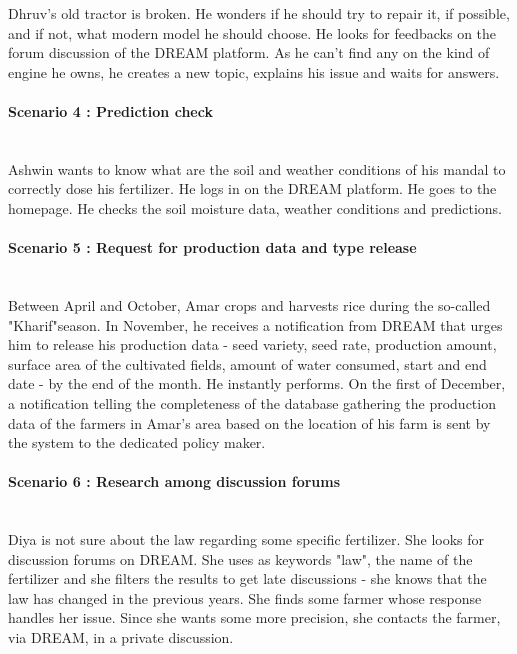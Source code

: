 Dhruv's old tractor is broken. He wonders if he should try to repair it, if possible, and if not, what modern model he should choose. He looks for feedbacks on the forum discussion of the DREAM platform. As he can't find any on the kind of engine he owns, he creates a new topic, explains his issue and waits for answers.

\paragraph{Scenario 4 : Prediction check}\mbox{} \\

Ashwin wants to know what are the soil and weather conditions of his mandal to correctly dose his fertilizer. He logs in on the DREAM platform. He goes to the homepage. He checks the soil moisture data, weather conditions and predictions.

\paragraph{Scenario 5 : Request for production data and type release}\mbox{} \\

Between April and October, Amar crops and harvests rice during the so-called "Kharif"season. In November, he receives a notification from DREAM that urges him to release his production data - seed variety, seed rate, production amount, surface area of the cultivated fields, amount of water consumed, start and end date - by the end of the month. He instantly performs. On the first of December, a notification telling the completeness of the database gathering the production data of the farmers in Amar's area based on the location of his farm is sent by the system to the dedicated policy maker.

\paragraph{Scenario 6 : Research among discussion forums}\mbox{} \\

Diya is not sure about the law regarding some specific fertilizer. She looks for discussion forums on DREAM. She uses as keywords "law", the name of the fertilizer and she filters the results to get late discussions - she knows that the law has changed in the previous years. She finds some farmer whose response handles her issue. Since she wants some more precision, she contacts the farmer, via DREAM, in a private discussion.

